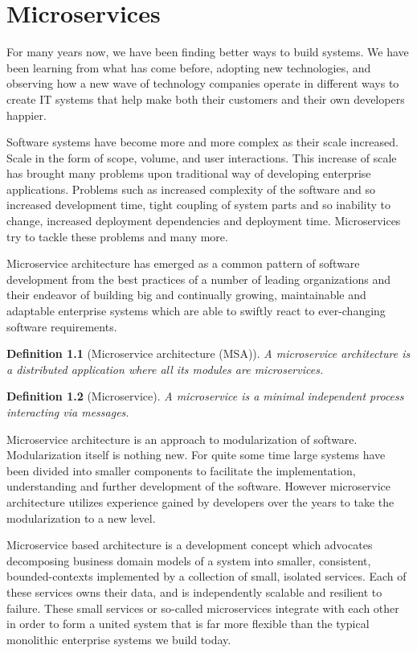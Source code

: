\documentclass[12pt,oneside]{fithesis2}
\newtheorem{definition}{Definition}
\begin{document}
\chapter{Microservices}

For many years now, we have been finding better ways to build systems. We have been learning from what has come before, adopting new technologies, and observing how a new wave of technology companies operate in different ways to create IT systems that help make both their customers and their own developers happier. \cite{ma}

Software systems have become more and more complex as their scale increased. Scale in the form of scope, volume, and user interactions. This increase of scale has brought many problems upon traditional way of developing enterprise applications. Problems such as increased complexity of the software and so increased development time, tight coupling of system parts and so inability to change, increased deployment dependencies and deployment time. Microservices try to tackle these problems and many more.

Microservice architecture has emerged as a common pattern of software development from the best practices of a number of leading organizations and their endeavor of building big and continually growing, maintainable and adaptable enterprise systems which are able to swiftly react to ever-changing software requirements.

\begin{definition}[Microservice architecture (MSA)]
A microservice architecture is a distributed application where all its modules are microservices. \cite{mytat}
\end{definition}

\begin{definition}[Microservice]
A microservice  is  a  minimal  independent  process  interacting via messages. \cite{mytat}
\end{definition}

Microservice architecture is an approach to modularization of software. Modularization itself is nothing new. For quite some time large systems have been divided into smaller components to facilitate the implementation, understanding and further development of the software. However microservice architecture utilizes experience gained by developers over the years to take the modularization to a new level.

Microservice based architecture is a development concept which advocates decomposing business domain models of a system into smaller, consistent, bounded-contexts implemented by a collection of small, isolated services. Each of these services owns their data, and is independently scalable and resilient to failure. These small services or so-called microservices integrate with each other in order to form a united system that is far more flexible than the typical monolithic enterprise systems we build today. \cite{rma}
\end{document}
